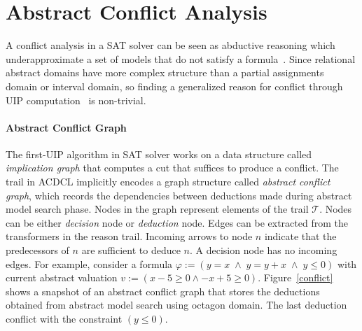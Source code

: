 \section{Abstract Conflict Analysis}
A conflict analysis in a SAT solver can be seen as abductive 
reasoning which underapproximate a set of models that do not satisfy a 
formula~\cite{sas12,dhk2013-popl}.  
Since relational abstract domains have more complex structure than a partial 
assignments domain or interval domain, so finding a generalized reason for 
conflict through UIP computation~\cite{uip} is non-trivial. 

\paragraph {\textbf{Abstract Conflict Graph}}
The first-UIP algorithm in SAT solver works on a data structure called 
{\em implication graph} that computes a cut that suffices to produce a 
conflict.  The trail in ACDCL implicitly encodes a graph structure called 
{\em abstract conflict graph}, which records the dependencies between 
deductions made during abstract model search phase.  Nodes in the graph 
represent elements of the trail $\mathcal{T}$.  Nodes can be either 
{\em decision} node or {\em deduction} node. Edges can be extracted from
the transformers in the reason trail.  Incoming arrows to node $n$ 
indicate that the predecessors of $n$ are sufficient to deduce $n$.  
A decision node has no incoming edges.  
For example, consider a formula 
$\varphi:= (y=x \; \wedge \; y=y+x \; \wedge \; y \leq 0)$ with current 
abstract valuation $v:= (x-5 \geq 0 \wedge -x+5 \geq 0)$.  
Figure~\ref{conflict} shows a snapshot of an abstract conflict graph that 
stores the deductions obtained from abstract model search using octagon domain.  
The last deduction conflict with the constraint $(y \leq 0)$.  

